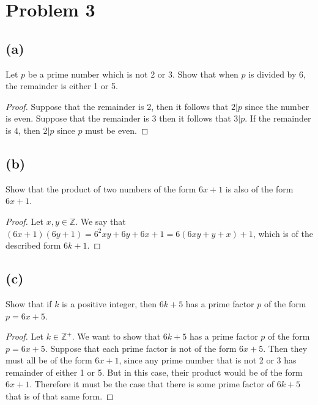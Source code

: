 \documentclass{article}
\theoremstyle{definition}
\begin{document}
\section*{Problem 3}
    \subsection*{(a)}
        Let $p$ be a prime number which is not 2 or 3. Show that when $p$ is divided by 6, the 
        remainder is either 1 or 5.
        \begin{proof}
            Suppose that the remainder is 2, then it follows that $2 | p$ since the number is even. Suppose that the remainder is $3$ then it follows
            that $3 | p$. If the remainder is $4$, then $2 | p$ since $p$ must be even.
        \end{proof}
    \subsection*{(b)}
        Show that the product of two numbers of the form $6x + 1$ is also of the form $6x + 1$.
        \begin{proof}
            Let $x,y \in \mathbb{Z}$. We say that $(6x + 1)(6y + 1) = 6^2xy + 6y + 6x + 1 = 6(6xy + y + x) + 1$, which is 
            of the described form $6k + 1$.
        \end{proof}
    \subsection*{(c)}
        Show that if $k$ is a positive integer, then $6k + 5$ has a prime factor $p$ of the form $p = 6x + 5$.
        \begin{proof}
            Let $k \in \mathbb{Z}^+$. We want to show that $6k + 5$ has a prime factor $p$ of the form
            $p = 6x + 5$. Suppose that each prime factor is not of the form $6x + 5$. Then they must all be of the form $6x + 1$, 
            since any prime number that is not 2 or 3 has remainder of either 1 or 5.
            But in this case, their product would be of the form $6x + 1$. Therefore 
            it must be the case that there is some prime factor of $6k + 5$ that is of that same form.
        \end{proof}
\end{document}
